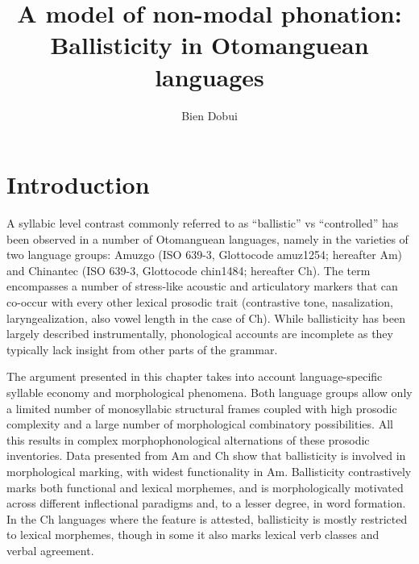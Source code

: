 \documentclass[output=paper]{langscibook}
\author{Bien Dobui\orcid{}\affiliation{Université de Picardie Jules Verne, CERCLL-PraLing (UR UPJV 4283) and SeDyl (UMR 8202 CNRS)}}
\title{A model of non-modal phonation: Ballisticity in Otomanguean languages}
\begin{document}
\maketitle 


\section{Introduction}\label{sec:dobui:1}

A syllabic level contrast commonly referred to as ``ballistic'' vs ``controlled'' has been observed in a number of Otomanguean languages, namely in the varieties of two language groups: Amuzgo (ISO 639-3, Glottocode amuz1254; hereafter Am) and Chinantec (ISO 639-3, Glottocode chin1484; hereafter Ch). The term encompasses a number of stress-like acoustic and articulatory markers that can co-occur with every other lexical prosodic trait (contrastive tone, nasalization, laryngealization, also vowel length in the case of Ch). While ballisticity has been largely described instrumentally, phonological accounts are incomplete as they typically lack insight from other parts of the grammar.

The argument presented in this chapter takes into account language-specific syllable economy and morphological phenomena. Both language groups allow only a limited number of monosyllabic structural frames coupled with high prosodic complexity and a large number of morphological combinatory possibilities. All this results in complex morphophonological alternations of these prosodic inventories. Data presented from Am and Ch show that ballisticity is involved in morphological marking, with widest functionality in Am. Ballisticity contrastively marks both functional and lexical morphemes, and is morphologically motivated across different inflectional paradigms and, to a lesser degree, in word formation. In the Ch languages where the feature is attested, ballisticity is mostly restricted to lexical morphemes, though in some it also marks lexical verb classes and verbal agreement.
\end{document}
